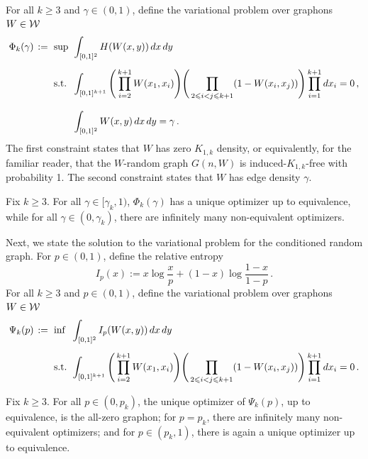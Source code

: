 For all $k\geq3$ and $\gamma\in(0,1)$, define the variational problem over graphons $W\in{\mathcal W}$
\begin{equation}\label{eqn:var-prob-intro-gamma}
\arraycolsep=3pt
\begin{array}[t]{lll}
\Phi_k(\gamma) \hspace{0.5mm}:= & \sup & \displaystyle\int_{[0,1]^2}H(W(x,y)) \, dx \, dy \\[16pt]
&\text{s.t.} & \displaystyle\int_{[0,1]^{k+1}}\Bigg(\prod_{i=2}^{k+1}W(x_1,x_i)\Bigg)\Bigg(\prod_{2\leq i<j\leq k+1}(1-W(x_i,x_j))\Bigg) \prod_{i=1}^{k+1}dx_i = 0 \,, \\[22pt]
&& \displaystyle\int_{[0,1]^2}W(x,y) \, dx \, dy=\gamma \,.
\end{array}
\end{equation}
The first constraint states that $W$ has zero $K_{1,k}$ density, or equivalently, for the familiar reader, that the $W$-random graph $G(n,W)$ is induced-$K_{1,k}$-free with probability 1. The second constraint states that $W$ has edge density $\gamma$.

\begin{theorem}\label{thm:ent-graphons}
Fix $k\geq3$. For all $\gamma\in[\gamma_k,1)$, $\Phi_k(\gamma)$ has a unique optimizer up to equivalence, while for all $\gamma\in(0,\gamma_k)$, there are infinitely many non-equivalent optimizers.
\end{theorem}

Next, we state the solution to the variational problem for the conditioned \erdosrenyi{} random graph. For $p\in(0,1)$, define the relative entropy
\begin{equation}\label{eqn:rel-ent-dfn}
I_p(x):=x\log\frac{x}{p}+(1-x)\log\frac{1-x}{1-p}\,.
\end{equation}
For all $k\geq3$ and $p\in(0,1)$, define the variational problem over graphons $W\in{\mathcal W}$
\begin{equation}\label{eqn:var-prob-intro-p}
\arraycolsep=3pt
\begin{array}[t]{lll}
\Psi_k(p) \hspace{0.5mm}:= & \inf & \displaystyle\int_{[0,1]^2}I_p(W(x,y)) \, dx \, dy \\[16pt]
&\text{s.t.} & \displaystyle\int_{[0,1]^{k+1}}\Bigg(\prod_{i=2}^{k+1}W(x_1,x_i)\Bigg)\Bigg(\prod_{2\leq i<j\leq k+1}(1-W(x_i,x_j))\Bigg) \prod_{i=1}^{k+1}dx_i = 0 \,.
\end{array}
\end{equation}

\begin{theorem}\label{thm:gnp-graphons}
Fix $k\geq3$. For all $p\in(0,p_k)$, the unique optimizer of $\Psi_k(p)$, up to equivalence, is the all-zero graphon; for $p=p_k$, there are infinitely many non-equivalent optimizers; and for $p\in(p_k,1)$, there is again a unique optimizer up to equivalence.
\end{theorem}


